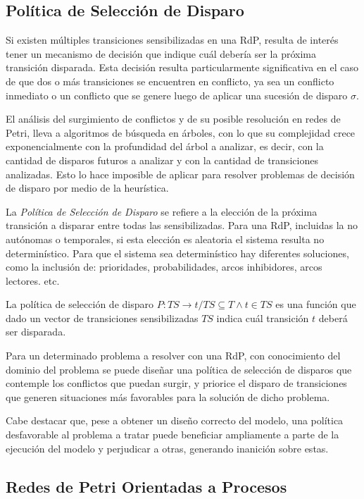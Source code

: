 \subsection{Política de Selección de Disparo}

Si existen múltiples transiciones sensibilizadas en una RdP, resulta de interés
tener un mecanismo de decisión que indique cuál debería ser la próxima
transición disparada.
Esta decisión resulta particularmente significativa en el caso de que dos o más
transiciones se encuentren en conflicto, ya sea un conflicto inmediato o un
conflicto que se genere luego de aplicar una sucesión de disparo $\sigma$.

El análisis del surgimiento de conflictos y de su posible resolución en redes de
Petri, lleva a algoritmos de búsqueda en árboles, con lo que su complejidad
crece exponencialmente con la profundidad del árbol a analizar, es decir, con
la cantidad de disparos futuros a analizar y con la cantidad de transiciones
analizadas. Esto lo hace imposible de aplicar para resolver problemas de
decisión de disparo por medio de la heurística.

La \textit{Política de Selección de Disparo} se refiere a la elección de la
próxima transición a disparar entre todas las sensibilizadas. Para una RdP,
incluidas la no autónomas o temporales, si esta elección es aleatoria el sistema
resulta no determinístico. Para que el sistema sea determinístico hay diferentes
soluciones, como la inclusión de: prioridades, probabilidades, arcos
inhibidores, arcos lectores. etc. \cite{Ecuacion_generalizada_LAC}

La política de selección de disparo $P : TS \rightarrow t \slash TS \subseteq T
\land t \in TS $ es una función que dado un vector de transiciones
sensibilizadas $TS$ indica cuál transición $t$ deberá ser disparada.

Para un determinado problema a resolver con una RdP, con conocimiento del
dominio del problema se puede diseñar una política de selección de disparos que
contemple los conflictos que puedan surgir, y priorice el disparo de
transiciones que generen situaciones más favorables para la solución de dicho
problema.

Cabe destacar que, pese a obtener un diseño correcto del modelo, una política
desfavorable al problema a tratar puede beneficiar ampliamente a parte de la
ejecución del modelo y perjudicar a otras, generando inanición sobre estas.

\subsection{Redes de Petri Orientadas a Procesos}
\label{POPN}


